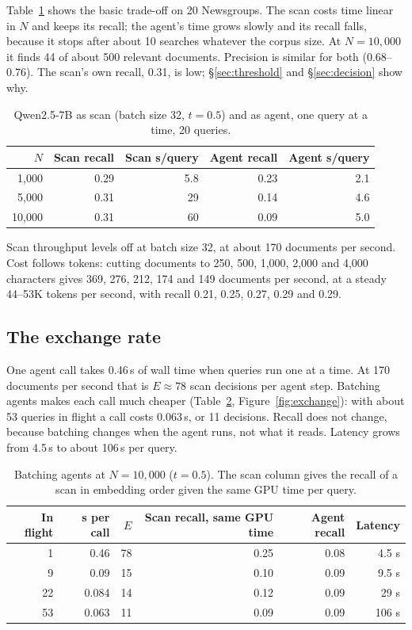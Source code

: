 \documentclass[11pt]{article}
\begin{document}
Table~\ref{tab:headline} shows the basic trade-off on 20 Newsgroups. The scan
costs time linear in $N$ and keeps its recall; the agent's time grows slowly
and its recall falls, because it stops after about 10 searches whatever the
corpus size. At $N=10{,}000$ it finds 44 of about 500 relevant documents.
Precision is similar for both (0.68--0.76). The scan's own recall, 0.31, is
low; \S\ref{sec:threshold} and \S\ref{sec:decision} show why.

\begin{table}[t]
\centering
\small
\begin{tabular}{@{}rrrrr@{}}
\toprule
$N$ & Scan recall & Scan s/query & Agent recall & Agent s/query \\
\midrule
1,000 & 0.29 & 5.8 & 0.23 & 2.1 \\
5,000 & 0.31 & 29 & 0.14 & 4.6 \\
10,000 & 0.31 & 60 & 0.09 & 5.0 \\
\bottomrule
\end{tabular}
\caption{Qwen2.5-7B as scan (batch size 32, $t=0.5$) and as agent, one query
at a time, 20 queries.}
\label{tab:headline}
\end{table}

Scan throughput levels off at batch size 32, at about 170 documents per second.
Cost follows tokens: cutting documents to 250, 500, 1,000, 2,000 and 4,000
characters gives 369, 276, 212, 174 and 149 documents per second, at a steady
44--53K tokens per second, with recall 0.21, 0.25, 0.27, 0.29 and 0.29.

\subsection{The exchange rate}
\label{sec:exchange}

One agent call takes 0.46\,s of wall time when queries run one at a time. At
170 documents per second that is $E \approx 78$ scan decisions per agent step.
Batching agents makes each call much cheaper (Table~\ref{tab:batch},
Figure~\ref{fig:exchange}): with about 53 queries in flight a call costs
0.063\,s, or 11 decisions. Recall does not change, because batching changes
when the agent runs, not what it reads. Latency grows from 4.5\,s to about
106\,s per query.

\begin{table}[t]
\centering
\small
\begin{tabular}{@{}rrrrrr@{}}
\toprule
In flight & s per call & $E$ & Scan recall, same GPU time & Agent recall & Latency \\
\midrule
1 & 0.46 & 78 & 0.25 & 0.08 & 4.5 s \\
9 & 0.09 & 15 & 0.10 & 0.09 & 9.5 s \\
22 & 0.084 & 14 & 0.12 & 0.09 & 29 s \\
53 & 0.063 & 11 & 0.09 & 0.09 & 106 s \\
\bottomrule
\end{tabular}
\caption{Batching agents at $N=10{,}000$ ($t=0.5$). The scan column gives the
recall of a scan in embedding order given the same GPU time per query.}
\label{tab:batch}
\end{table}
\end{document}

